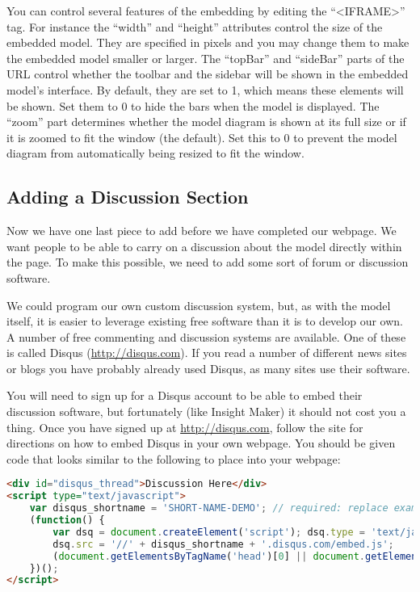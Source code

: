\documentclass[]{memoir}
\begin{document}
You can control several features of the embedding by editing the
``\textless{}IFRAME\textgreater{}'' tag. For instance the ``width'' and
``height'' attributes control the size of the embedded model. They are
specified in pixels and you may change them to make the embedded model
smaller or larger. The ``topBar'' and ``sideBar'' parts of the URL
control whether the toolbar and the sidebar will be shown in the
embedded model's interface. By default, they are set to 1, which means
these elements will be shown. Set them to 0 to hide the bars when the
model is displayed. The ``zoom'' part determines whether the model
diagram is shown at its full size or if it is zoomed to fit the window
(the default). Set this to 0 to prevent the model diagram from
automatically being resized to fit the window.

\subsection{Adding a Discussion Section}

Now we have one last piece to add before we have completed our webpage.
We want people to be able to carry on a discussion about the model
directly within the page. To make this possible, we need to add some
sort of forum or discussion software.

We could program our own custom discussion system, but, as with the
model itself, it is easier to leverage existing free software than it is
to develop our own. A number of free commenting and discussion systems
are available. One of these is called Disqus (\url{http://disqus.com}).
If you read a number of different news sites or blogs you have probably
already used Disqus, as many sites use their software.

You will need to sign up for a Disqus account to be able to embed their
discussion software, but fortunately (like Insight Maker) it should not
cost you a thing. Once you have signed up at \url{http://disqus.com},
follow the site for directions on how to embed Disqus in your own
webpage. You should be given code that looks similar to the following to
place into your webpage:

\begin{lstlisting}[language=HTML]
<div id="disqus_thread">Discussion Here</div>
<script type="text/javascript">
    var disqus_shortname = 'SHORT-NAME-DEMO'; // required: replace example with your forum shortname
    (function() {
        var dsq = document.createElement('script'); dsq.type = 'text/javascript'; dsq.async = true;
        dsq.src = '//' + disqus_shortname + '.disqus.com/embed.js';
        (document.getElementsByTagName('head')[0] || document.getElementsByTagName('body')[0]).appendChild(dsq);
    })();
</script>   
\end{lstlisting}
\end{document}
